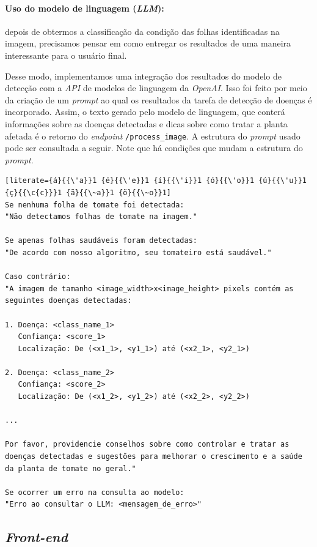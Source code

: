 \paragraph{Uso do modelo de linguagem (\emph{LLM}):} depois de obtermos a classificação da condição das folhas identificadas na imagem, precisamos pensar em como entregar os resultados de uma maneira interessante para o usuário final.

Desse modo, implementamos uma integração dos resultados do modelo de detecção com a \emph{API} de modelos de linguagem da \emph{OpenAI}. Isso foi feito por meio da criação de um \emph{prompt} ao qual os resultados da tarefa de detecção de doenças é incorporado. Assim, o texto gerado pelo modelo de linguagem, que conterá informações sobre as doenças detectadas e dicas sobre como tratar a planta afetada é o retorno do \emph{endpoint} \texttt{/process\_image}. A estrutura do \emph{prompt} usado pode ser consultada a seguir. Note que há condições que mudam a estrutura do \emph{prompt}.

\begin{lstlisting}[literate={á}{{\'a}}1 {é}{{\'e}}1 {í}{{\'i}}1 {ó}{{\'o}}1 {ú}{{\'u}}1 {ç}{{\c{c}}}1 {ã}{{\~a}}1 {õ}{{\~o}}1]
Se nenhuma folha de tomate foi detectada:
"Não detectamos folhas de tomate na imagem."

Se apenas folhas saudáveis foram detectadas:
"De acordo com nosso algoritmo, seu tomateiro está saudável."

Caso contrário:
"A imagem de tamanho <image_width>x<image_height> pixels contém as seguintes doenças detectadas:

1. Doença: <class_name_1>
   Confiança: <score_1>
   Localização: De (<x1_1>, <y1_1>) até (<x2_1>, <y2_1>)

2. Doença: <class_name_2>
   Confiança: <score_2>
   Localização: De (<x1_2>, <y1_2>) até (<x2_2>, <y2_2>)

...

Por favor, providencie conselhos sobre como controlar e tratar as doenças detectadas e sugestões para melhorar o crescimento e a saúde da planta de tomate no geral."

Se ocorrer um erro na consulta ao modelo:
"Erro ao consultar o LLM: <mensagem_de_erro>"

\end{lstlisting}

\subsection{\emph{Front-end}}

